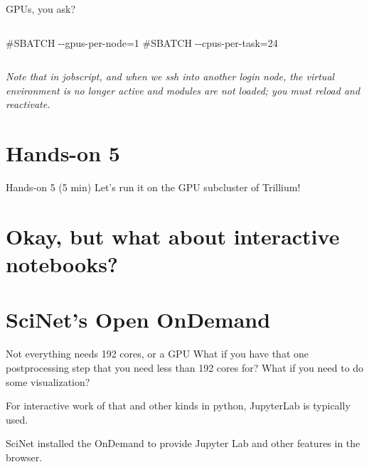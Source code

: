 \documentclass[
  10pt,
  ignorenonframetext,
  aspectratio=169,handout]{beamer}
\newenvironment{Shaded}{\begin{snugshade}}{\end{snugshade}}
\newcommand{\CommentTok}[1]{\textcolor[rgb]{0.50,0.62,0.50}{#1}}
\begin{document}
\begin{frame}[fragile]{GPUs, you ask?}
\begin{columns}[T]
\begin{column}{0.47\linewidth}
\begin{Shaded}
\begin{Highlighting}[]
\CommentTok{\#SBATCH {-}{-}gpus{-}per{-}node=1}
\CommentTok{\#SBATCH {-}{-}cpus{-}per{-}task=24}
\end{Highlighting}
\end{Shaded}
\end{column}
\end{columns}

\pause

\emph{Note that in jobscript, and when we ssh into another login node, the virtual environment is no longer active and modules are not loaded; you must reload and reactivate.}
\end{frame}

\section{Hands-on 5}\label{hands-on-5}

\begin{frame}{Hands-on 5 (5 min)}
\label{hands-on-5-5-min}
Let's run it on the GPU subcluster of Trillium!
\end{frame}

\section{Okay, but what about interactive notebooks?}\label{okay-but-what-about-interactive-notebooks}

\section{SciNet's Open OnDemand}\label{scinets-open-ondemand}

\begin{frame}{Not everything needs 192 cores, or a GPU}
\label{not-everything-needs-192-cores-or-a-gpu}
What if you have that one postprocessing step that you need less than 192 cores for? \vspace{\baselineskip} What if you need to do some visualization? \vspace{\baselineskip}

\pause

For interactive work of that and other kinds in python, JupyterLab is typically used.

\pause

SciNet installed the OnDemand to provide Jupyter Lab and other features in the browser.
\end{frame}
\end{document}
